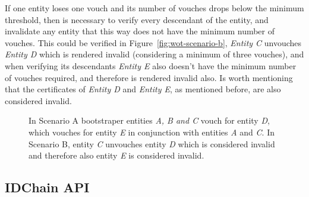 If one entity loses one vouch and its number of vouches drops below the minimum threshold, then is necessary to verify every descendant of the entity, and invalidate any entity that this way does not have the minimum number of vouches.
This could be verified in Figure~\ref{fig:wot-scenario-b}, \textit{Entity C} unvouches \textit{Entity D} which is rendered invalid (considering a minimum of three vouches), and when verifying its descendants \textit{Entity E} also doesn't have the minimum number of vouches required, and therefore is rendered invalid also.
Is worth mentioning that the certificates of \textit{Entity D} and \textit{Entity E}, as mentioned before, are also considered invalid.

\begin{figure}
  \centering
  \caption{In Scenario A bootstraper entities \textit{A, B and C} vouch for entity \textit{D}, which vouches for entity \textit{E} in conjunction with entities \textit{A} and \textit{C}. In Scenario B, entity \textit{C} unvouches entity \textit{D} which is considered invalid and therefore also entity \textit{E} is considered invalid.}
\end{figure}

\subsection{IDChain \ac{API}}

